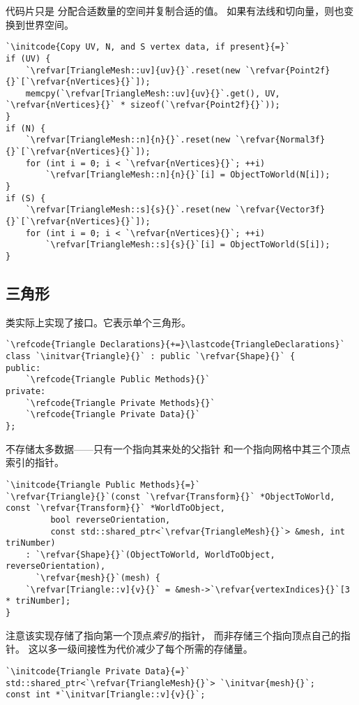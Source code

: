 代码片只是
分配合适数量的空间并复制合适的值。
如果有法线和切向量，则也变换到世界空间。
\begin{lstlisting}
`\initcode{Copy UV, N, and S vertex data, if present}{=}`
if (UV) {
    `\refvar[TriangleMesh::uv]{uv}{}`.reset(new `\refvar{Point2f}{}`[`\refvar{nVertices}{}`]);
    memcpy(`\refvar[TriangleMesh::uv]{uv}{}`.get(), UV, `\refvar{nVertices}{}` * sizeof(`\refvar{Point2f}{}`));
}
if (N) {
    `\refvar[TriangleMesh::n]{n}{}`.reset(new `\refvar{Normal3f}{}`[`\refvar{nVertices}{}`]);
    for (int i = 0; i < `\refvar{nVertices}{}`; ++i)
        `\refvar[TriangleMesh::n]{n}{}`[i] = ObjectToWorld(N[i]);
}
if (S) {
    `\refvar[TriangleMesh::s]{s}{}`.reset(new `\refvar{Vector3f}{}`[`\refvar{nVertices}{}`]);
    for (int i = 0; i < `\refvar{nVertices}{}`; ++i)
        `\refvar[TriangleMesh::s]{s}{}`[i] = ObjectToWorld(S[i]);
}
\end{lstlisting}

\subsection{三角形}\label{sub:三角形}
类实际上实现了接口。它表示单个三角形。
\begin{lstlisting}
`\refcode{Triangle Declarations}{+=}\lastcode{TriangleDeclarations}`
class `\initvar{Triangle}{}` : public `\refvar{Shape}{}` {
public:
    `\refcode{Triangle Public Methods}{}`
private:
    `\refcode{Triangle Private Methods}{}`
    `\refcode{Triangle Private Data}{}`
};
\end{lstlisting}

不存储太多数据——只有一个指向其来处的父指针
和一个指向网格中其三个顶点索引的指针。
\begin{lstlisting}
`\initcode{Triangle Public Methods}{=}`
`\refvar{Triangle}{}`(const `\refvar{Transform}{}` *ObjectToWorld, const `\refvar{Transform}{}` *WorldToObject,
         bool reverseOrientation,
         const std::shared_ptr<`\refvar{TriangleMesh}{}`> &mesh, int triNumber)
    : `\refvar{Shape}{}`(ObjectToWorld, WorldToObject, reverseOrientation),
      `\refvar{mesh}{}`(mesh) {
    `\refvar[Triangle::v]{v}{}` = &mesh->`\refvar{vertexIndices}{}`[3 * triNumber];
}
\end{lstlisting}

注意该实现存储了指向第一个顶点\emph{索引}的指针，
而非存储三个指向顶点自己的指针。
这以多一级间接性为代价减少了每个所需的存储量。
\begin{lstlisting}
`\initcode{Triangle Private Data}{=}`
std::shared_ptr<`\refvar{TriangleMesh}{}`> `\initvar{mesh}{}`;
const int *`\initvar[Triangle::v]{v}{}`;
\end{lstlisting}

